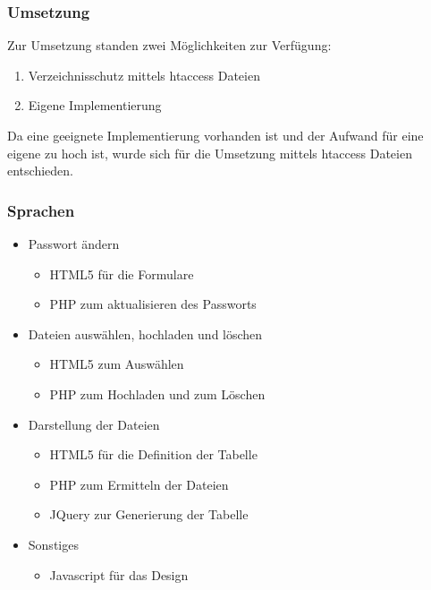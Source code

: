 \begin{frame} %
  \frametitle{Umsetzung} %

  Zur Umsetzung standen zwei Möglichkeiten zur Verfügung:
  \bigskip
  \begin{enumerate}
   \item Verzeichnisschutz mittels htaccess Dateien
   \item Eigene Implementierung
  \end{enumerate}

  \bigskip

  Da eine geeignete Implementierung vorhanden ist und der Aufwand für eine eigene zu hoch ist, wurde sich für die Umsetzung mittels htaccess Dateien entschieden.
\end{frame}

\begin{frame} %
  \frametitle{Sprachen} %

   \begin{itemize}
    \item Passwort ändern
    \begin{itemize}
     \item HTML5 für die Formulare
     \item PHP zum aktualisieren des Passworts
    \end{itemize}

    \item Dateien auswählen, hochladen und löschen
    \begin{itemize}
     \item HTML5 zum Auswählen
     \item PHP zum Hochladen und zum Löschen
    \end{itemize}

    \item Darstellung der Dateien
    \begin{itemize}
     \item HTML5 für die Definition der Tabelle
     \item PHP zum Ermitteln der Dateien
     \item JQuery zur Generierung der Tabelle
    \end{itemize}

    \item Sonstiges
    \begin{itemize}
     \item Javascript für das Design
    \end{itemize}

   \end{itemize}

\end{frame}

